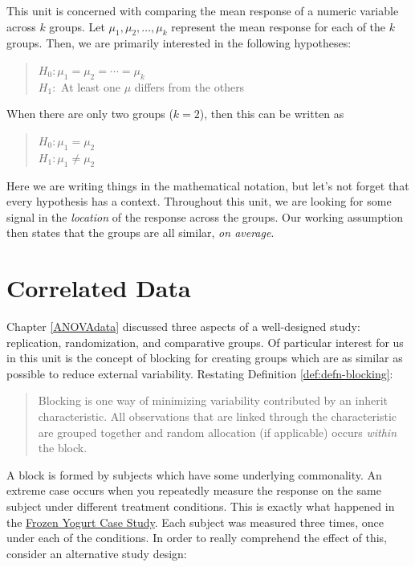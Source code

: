 \documentclass[]{book}
\theoremstyle{plain}
\theoremstyle{mydefn}
\theoremstyle{myexmpl}
\theoremstyle{remark}
\begin{document}
This unit is concerned with comparing the mean response of a numeric
variable across \(k\) groups. Let \(\mu_1, \mu_2, \dotsc, \mu_k\)
represent the mean response for each of the \(k\) groups. Then, we are
primarily interested in the following hypotheses:

\begin{quote}
\(H_0: \mu_1 = \mu_2 = \dotsb = \mu_k\)\\
\(H_1:\) At least one \(\mu\) differs from the others
\end{quote}

When there are only two groups (\(k = 2\)), then this can be written as

\begin{quote}
\(H_0: \mu_1 = \mu_2\)\\
\(H_1: \mu_1 \neq \mu_2\)
\end{quote}

Here we are writing things in the mathematical notation, but let's not
forget that every hypothesis has a context. Throughout this unit, we are
looking for some signal in the \emph{location} of the response across
the groups. Our working assumption then states that the groups are all
similar, \emph{on average}.

\chapter{Correlated Data}\label{Blockdata}

Chapter \ref{ANOVAdata} discussed three aspects of a well-designed
study: replication, randomization, and comparative groups. Of particular
interest for us in this unit is the concept of blocking for creating
groups which are as similar as possible to reduce external variability.
Restating Definition \ref{def:defn-blocking}:

\begin{quote}
Blocking is one way of minimizing variability contributed by an inherit
characteristic. All observations that are linked through the
characteristic are grouped together and random allocation (if
applicable) occurs \emph{within} the block.
\end{quote}

A block is formed by subjects which have some underlying commonality. An
extreme case occurs when you repeatedly measure the response on the same
subject under different treatment conditions. This is exactly what
happened in the \protect\hyperlink{CaseYogurt}{Frozen Yogurt Case
Study}. Each subject was measured three times, once under each of the
conditions. In order to really comprehend the effect of this, consider
an alternative study design:
\end{document}
